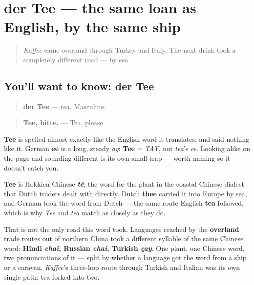 \section[der Tee]{der Tee — the same loan as English, by the same ship}

\label{lesson:GE-C28-tee}



\begin{quote}
\emph{Kaffee} came overland through Turkey and Italy. The next drink took a completely different road — by sea.
\end{quote}

\subsection*{You'll want to know: der Tee}
\begin{quote}
\textbf{der Tee} — tea. Masculine.
\end{quote}

\begin{quote}
\textbf{Tee, bitte.} — Tea, please.
\end{quote}

\begin{sounds}
\textbf{Tee} is spelled almost exactly like the English word it translates, and said nothing like it. German \textbf{ee} is a long, steady \emph{ay}: \textbf{Tee} = \emph{TAY}, not \emph{tea}'s \emph{ee}. Looking alike on the page and sounding different is its own small trap — worth naming so it doesn't catch you.
\end{sounds}

\begin{cousinweb}
\textbf{Tee} is Hokkien Chinese \emph{\textbf{tê}}, the word for the plant in the coastal Chinese dialect that Dutch traders dealt with directly. Dutch \textbf{thee} carried it into Europe by sea, and German took the word from Dutch — the same route English \textbf{tea} followed, which is why \emph{Tee} and \emph{tea} match as closely as they do.

That is not the only road this word took. Languages reached by the \textbf{overland} trade routes out of northern China took a different syllable of the same Chinese word: \textbf{Hindi \emph{chai}, Russian \emph{chai}, Turkish \emph{çay}}. One plant, one Chinese word, two pronunciations of it — split by whether a language got the word from a ship or a caravan. \emph{Kaffee}'s three-hop route through Turkish and Italian was its own single path; tea forked into two.
\end{cousinweb}

